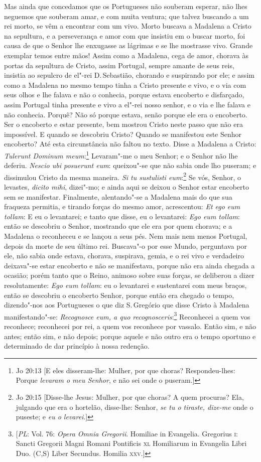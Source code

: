 Mas ainda que concedamos que os Portugueses não souberam esperar, não
lhes neguemos que souberam amar, e com muita ventura; que talvez
buscando a um rei morto, se vêm a encontrar com um vivo. Morto buscava a
Madalena a Cristo na sepultura, e a perseverança e amor com que insistiu
em o buscar morto, foi causa de que o Senhor lhe enxugasse as lágrimas e
se lhe mostrasse vivo. Grande exemplar temos entre mãos! Assim como a
Madalena, cega de amor, chorava às portas da sepultura de Cristo, assim
Portugal, sempre amante de seus reis, insistia ao sepulcro de el"-rei D.\,Sebastião, chorando e suspirando por ele; e assim como a Madalena no
mesmo tempo tinha a Cristo presente e vivo, e o via com seus olhos e lhe
falava e não o conhecia, porque estava encoberto e disfarçado, assim
Portugal tinha presente e vivo a el"-rei nosso senhor, e o via e lhe
falava e não conhecia. Porquê? Não só porque estava, senão porque ele
era o encoberto. Ser o encoberto e estar presente, bem mostrou Cristo
neste passo que não era impossível. E quando se descobriu Cristo? Quando
se manifestou este Senhor encoberto? Até esta circunstância não faltou
no texto. Disse a Madalena a Cristo: \emph{Tulerunt Dominum meum}:\footnote{Jo 20:13 [E eles disseram-lhe: Mulher, por que choras? Respondeu-lhes: Porque \textit{levaram o meu Senhor}, e não sei onde o puseram.]}
Levaram"-me o meu Senhor; e o Senhor não lhe deferiu. \emph{Nescio ubi
posuerunt eum}: queixou"-se que não sabia onde lho puseram; e dissimulou
Cristo da mesma maneira. \emph{Si tu sustulisti eum}:\footnote{Jo 20:15 [Disse-lhe Jesus: Mulher, por que choras? A quem procuras? Ela, julgando que era o hortelão, disse-lhe: Senhor, \textit{se tu o tiraste, dize-me} onde o puseste; e \textit{eu o levarei}.]} Se vós, Senhor, o
levastes, \emph{dicito mihi}, dizei"-mo; e ainda aqui se deixou o Senhor
estar encoberto sem se manifestar. Finalmente, alentando"-se a Madalena
mais do que sua fraqueza permitia, e tirando forças do mesmo amor,
acrescentou: \emph{Et ego eum tollam}: E eu o levantarei; e tanto
que disse, eu o levantarei: \emph{Ego eum tollam}: então se descobriu
o Senhor, mostrando que ele era por quem chorava; e a Madalena o
reconheceu e se lançou a seus pés.
Nem mais nem menos Portugal, depois da morte de seu último rei.
Buscava"-o por esse Mundo, perguntava por ele, não sabia onde estava,
chorava, suspirava, gemia, e o rei vivo e verdadeiro deixava"-se estar
encoberto e não se manifestava,
porque não era ainda chegada a ocasião; porém tanto que o Reino, animoso
sobre suas forças, se deliberou a dizer resolutamente: \emph{Ego eum
tollam}: eu o levantarei e sustentarei com meus braços, então se
descobriu o encoberto Senhor, porque então era chegado o tempo,
dizendo"-nos aos Portugueses o que diz S.\,Gregório que disse Cristo à
Madalena manifestando"-se: \emph{Recognosce eum, a quo recognosceris}:\footnote{[\textit{PL}: Vol. 76: \textit{Opera Omnia Gregorii}. Homiliae in Evangelia. Gregorius \textsc{i}: Sancti Gregorii Magni Romani Pontificis \textsc{xl} Homiliarum in Evangelia Libri Duo. (C,S) Liber Secundus. Homilia \textsc{xxv}.]}
Reconhecei a quem vos reconhece; reconhecei por rei, a quem vos
reconhece por vassalo. Então sim, e não antes; então sim, e não depois;
porque aquele e não outro era o tempo oportuno e determinado de dar
princípio à nossa redenção.

